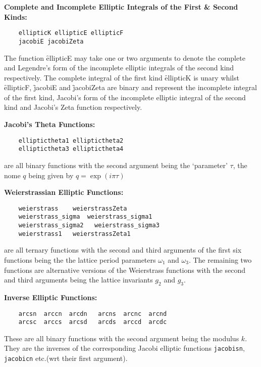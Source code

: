 \textbf{Complete and Incomplete Elliptic Integrals of the First \& Second Kinds:}
\begin{verbatim}
    ellipticK ellipticE ellipticF 
    jacobiE jacobiZeta
\end{verbatim}
The function \f{ellipticE} may take one or two arguments to
denote the complete and Legendre's form of the incomplete elliptic integrals of
the second kind respectively. The complete integral of the first kind
\f{ellipticK} is unary whilst \f{ellipticF}, \f{jacobiE} and
\f{jacobiZeta} are binary and represent the incomplete integral of
the first kind, Jacobi's form of the incomplete elliptic integral of
the second kind and Jacobi's Zeta function respectively.

\textbf{Jacobi's Theta Functions:}
\begin{verbatim}
    elliptictheta1 elliptictheta2
    elliptictheta3 elliptictheta4
\end{verbatim}
are all binary functions with the second argument being the `parameter' $\tau$,
the nome $q$ being given by $q = \exp(i\pi\tau)$

\textbf{Weierstrassian Elliptic Functions:}
\begin{verbatim}
    weierstrass    weierstrassZeta
    weierstrass_sigma  weierstrass_sigma1  
    weierstrass_sigma2   weierstrass_sigma3
    weierstrass1   weierstrassZeta1
\end{verbatim}
are all ternary functions with the second and third arguments of the first
six functions being the the lattice period parameters $\omega_1$ and $\omega_3$.
The remaining two functions are alternative versions of the Weierstrass
functions with the second and third arguments being the lattice invariants
$g_2$ and $g_3$.

\textbf{Inverse Elliptic Functions:}
\begin{verbatim}
    arcsn  arccn  arcdn   arcns  arcnc  arcnd
    arcsc  arccs  arcsd   arcds  arccd  arcdc
\end{verbatim}
These are all binary functions with the second argument being the modulus $k$.
They are the inverses of the corresponding Jacobi elliptic functions
\texttt{jacobisn}, \texttt{jacobicn} etc.\/(wrt their first argument).

